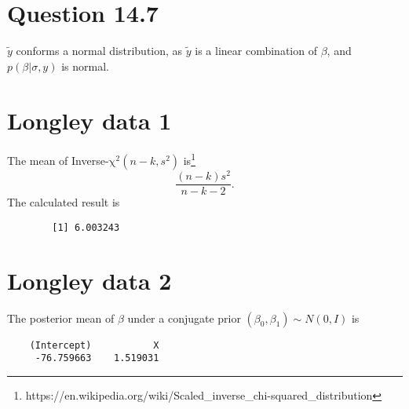 \documentclass{article}
\begin{document}
\section*{Question 14.7}
{
    $\widetilde{y}$ conforms a normal distribution, as $\widetilde{y}$ is a linear combination of $\beta$, and $p(\beta | \sigma, y)$ is normal.
}

\section*{Longley data 1}
{
    The mean of Inverse-$\mathrm{\chi^2}(n-k, s^2)$ is\footnote{https://en.wikipedia.org/wiki/Scaled\_inverse\_chi-squared\_distribution} 
    $$\frac{(n-k)s^2}{n-k-2}.$$
    The calculated result is 
    \begin{lstlisting}
        [1] 6.003243
    \end{lstlisting}
}

\section*{Longley data 2}
{
    The posterior mean of $\beta$ under a conjugate prior $(\beta_0, \beta_1) \sim N(0, I)$ is
    \begin{lstlisting}
    (Intercept)           X 
     -76.759663    1.519031 
    \end{lstlisting}
}
\end{document}
